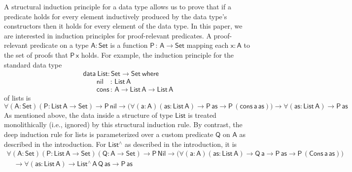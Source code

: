 \documentclass[9pt]{entcs}
\begin{document}
A structural induction principle for a data type allows us to prove
that if a predicate holds for every element inductively produced by
the data type's constructors then it holds for every element of the
data type.  In this paper, we are interested in induction principles
for proof-relevant predicates.  A proof-relevant predicate on a type
$\mathsf{A : Set}$ is a function $\mathsf{P\,:\,A \to Set}$ mapping
each $\mathsf{x : A}$ to the set of proofs that $\mathsf{P\,x}$ holds.
For example, the induction principle for the standard data type
\begin{equation*}\label{eq:list}
\begin{array}{l}
\mathsf{data\ List : Set \to Set\ where}\\
\mathsf{\;\;\;\;\;\;\;nil\,\,\,\,\,\, :\, List\,A}\\
\mathsf{\;\;\;\;\;\;\;cons\, :\, A \to List\,A \to List\,A} 
\end{array}
\end{equation*}
of lists is
\begin{equation*}
\mathsf{
\forall (A : Set) (P : List\,A \to Set)
\to P\,nil
\to \big( \forall (a : A) (as: List\,A)
\to P\,as
\to P\,(cons\,a\,as)\big)
\to \forall (as : List\,A)
\to P\, as
}
\end{equation*}
As mentioned above, the data inside a structure of type
$\mathsf{List}$ is treated monolithically (i.e., ignored) by this
structural induction rule.
By contrast, the deep induction rule for lists is parameterized over a
custom predicate $\mathsf{Q}$ on $\mathsf{A}$ as described in the
introduction. For $\mathsf{List^\wedge}$ as described in the
introduction, it is
\[
\begin{array}{l}
\mathsf{\forall (A : Set) (P : List\, A \to Set) (Q : A \to Set)
\to P\,Nil \to \big( \forall (a : A) (as: List\,A) \to Q\,a \to P\,as
\to P\,(Cons\,a\,as)\big)} \\ 
\quad\mathsf{\to \forall (as : List\,A) \to List^{\wedge}\,A\,Q\,as
  \to P\,as } 
\end{array}
\]
\end{document}
